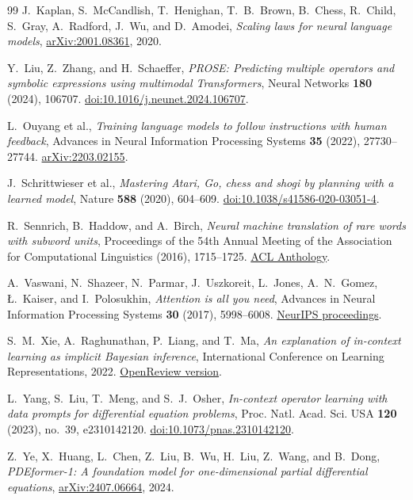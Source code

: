 \documentclass[11pt]{amsart}
\numberwithin{equation}{section}
\theoremstyle{definition}
\theoremstyle{plain}
\theoremstyle{remark}
\begin{document}
\begin{thebibliography}{99}
J.~Kaplan, S.~McCandlish, T.~Henighan, T.~B.~Brown, B.~Chess, R.~Child,
S.~Gray, A.~Radford, J.~Wu, and D.~Amodei,
\emph{Scaling laws for neural language models},
\href{https://arxiv.org/abs/2001.08361}{arXiv:2001.08361}, 2020.

Y.~Liu, Z.~Zhang, and H.~Schaeffer,
\emph{PROSE: Predicting multiple operators and symbolic expressions using
multimodal Transformers},
Neural Networks \textbf{180} (2024), 106707.
\href{https://doi.org/10.1016/j.neunet.2024.106707}
{doi:10.1016/j.neunet.2024.106707}.

L.~Ouyang et al.,
\emph{Training language models to follow instructions with human feedback},
Advances in Neural Information Processing Systems \textbf{35} (2022),
27730--27744.
\href{https://arxiv.org/abs/2203.02155}{arXiv:2203.02155}.

J.~Schrittwieser et al.,
\emph{Mastering Atari, Go, chess and shogi by planning with a learned model},
Nature \textbf{588} (2020), 604--609.
\href{https://doi.org/10.1038/s41586-020-03051-4}
{doi:10.1038/s41586-020-03051-4}.

R.~Sennrich, B.~Haddow, and A.~Birch,
\emph{Neural machine translation of rare words with subword units},
Proceedings of the 54th Annual Meeting of the Association for Computational
Linguistics (2016), 1715--1725.
\href{https://aclanthology.org/P16-1162/}{ACL Anthology}.

A.~Vaswani, N.~Shazeer, N.~Parmar, J.~Uszkoreit, L.~Jones, A.~N.~Gomez,
\L.~Kaiser, and I.~Polosukhin,
\emph{Attention is all you need},
Advances in Neural Information Processing Systems \textbf{30} (2017),
5998--6008.
\href{https://proceedings.neurips.cc/paper_files/paper/2017/hash/3f5ee243547dee91fbd053c1c4a845aa-Abstract.html}
{NeurIPS proceedings}.

S.~M.~Xie, A.~Raghunathan, P.~Liang, and T.~Ma,
\emph{An explanation of in-context learning as implicit Bayesian inference},
International Conference on Learning Representations, 2022.
\href{https://openreview.net/forum?id=RdJVFCHjUMI}{OpenReview version}.

L.~Yang, S.~Liu, T.~Meng, and S.~J.~Osher,
\emph{In-context operator learning with data prompts for differential equation
problems},
Proc. Natl. Acad. Sci. USA \textbf{120} (2023), no.~39, e2310142120.
\href{https://doi.org/10.1073/pnas.2310142120}
{doi:10.1073/pnas.2310142120}.

Z.~Ye, X.~Huang, L.~Chen, Z.~Liu, B.~Wu, H.~Liu, Z.~Wang, and B.~Dong,
\emph{PDEformer-1: A foundation model for one-dimensional partial differential
equations},
\href{https://arxiv.org/abs/2407.06664}{arXiv:2407.06664}, 2024.

\end{thebibliography}
\end{document}
